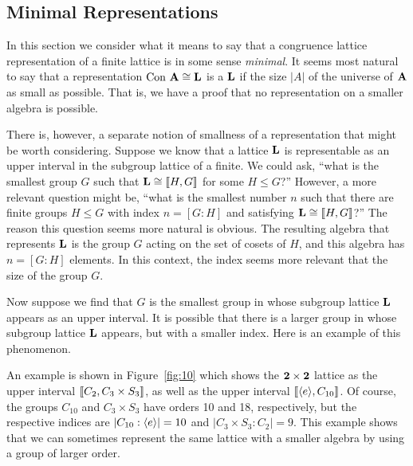 {\subsection{Minimal Representations}
In this section we consider what it means to say that
a congruence lattice representation of a finite lattice is in some sense
\emph{minimal}.
It seems most natural to say that a representation $\operatorname{Con\,} \mathbf{A} \cong \mathbf{L}$
is a  $\mathbf{L}$ if the size
$|A|$ of the universe of $\mathbf{A}$ as small as possible. That is, we have a proof
that no representation on a smaller algebra is possible.

There is, however, a separate notion of smallness of a representation that might
be worth considering.  Suppose we know that a lattice $\mathbf{L}$ is representable as
an upper interval in the subgroup lattice of a finite.  We could ask, ``what is
the smallest group $G$ such that $\mathbf{L} \cong \llbracket H, G \rrbracket$ for some $H\leq G$?''
However, a more relevant question might be, ``what is the smallest number $n$
such that there are finite groups $H\leq G$ with index $n = [G:H]$ and 
satisfying $\mathbf{L} \cong \llbracket H, G \rrbracket$?''  The reason this question seems more
natural is obvious. The resulting algebra that represents $\mathbf{L}$ is the group
$G$ acting on the set of cosets of $H$, and this algebra has $n = [G:H]$
elements.  In this context, the index seems more relevant that the size of the
group $G$.

Now suppose we find that $G$ is the smallest group in whose subgroup lattice
$\mathbf{L}$ appears as an upper interval. It is possible that there is a larger group
in whose subgroup lattice $\mathbf{L}$ appears, but with a smaller index.
Here is an example of this phenomenon.

An example is shown in Figure~\ref{fig:10} which shows
the $\mathbf{2}\times \mathbf{2}$ lattice as the upper interval
$\llbracket C_2, C_3 \times S_3\rrbracket$, as well as the upper interval
$\llbracket \langle e\rangle, C_{10}\rrbracket$. Of course, the groups $C_{10}$ and
$C_3 \times S_3$ have orders 10 and 18, respectively, but
the respective indices are
$|C_{10}:\langle e\rangle| = 10$ and $|C_3 \times S_3:C_2|=9$.
This example shows that we can sometimes represent the same lattice
with a smaller algebra by using a group of larger order.

}
